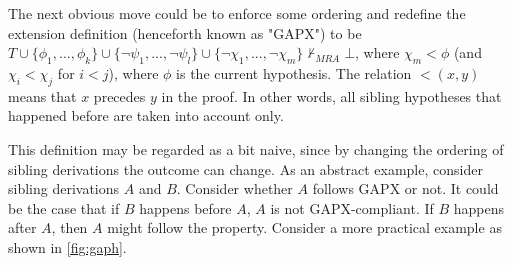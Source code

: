 \documentclass[11pt,twoside,a4paper]{report}
\begin{document}
The next obvious move could be to enforce some ordering and redefine the extension definition (henceforth known as "GAPX") to be $T\cup\{\phi_1, ..., \phi_k\}\cup\{\neg\psi_1, ..., \neg\psi_l\}\cup\{\neg\chi_1, ..., \neg\chi_m\}\nvdash_{MRA}\bot$, where $\chi_m < \phi$ (and $\chi_i < \chi_j$ for $i < j$), where $\phi$ is the current hypothesis. The relation $<(x, y)$ means that $x$ precedes $y$ in the proof. In other words, all sibling hypotheses that happened before are taken into account only.

This definition may be regarded as a bit naive, since by changing the ordering of sibling derivations the outcome can change. As an abstract example, consider sibling derivations $A$ and $B$. Consider whether $A$ follows GAPX or not. It could be the case that if $B$ happens before $A$, $A$ is not GAPX-compliant. If $B$ happens after $A$, then $A$ might follow the property. Consider a more practical example as shown in \autoref{fig:gaph}.
\end{document}
